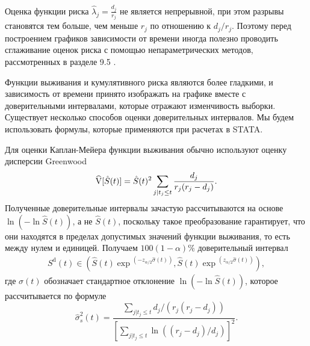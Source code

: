 \noindent
Оценка функции риска $\hat{\lambda}_j=\frac{d_j}{r_j}$ не является непрерывной, при этом разрывы становятся тем больше, чем меньше $r_j$ по отношению к $d_j/r_j$. Поэтому перед построением графиков зависимости от времени иногда полезно проводить сглаживание оценок риска с помощью непараметрических методов, рассмотренных в разделе 9.5%
.

Функции выживания и кумулятивного риска являются более гладкими, и зависимость от времени принято изображать на графике вместе с доверительными интервалами, которые отражают изменчивость выборки. Существует несколько способов оценки доверительных интервалов. Мы будем использовать формулы, которые применяются при расчетах в STATA.

Для оценки Каплан-Мейера функции выживания обычно используют оценку дисперсии Greenwood
    $$\widehat{\mathrm{V}}[\hat{S}(t)]=\hat{S}(t)^2\sum_{j|t_j\le t}\frac{d_j}{r_j(r_j-d_j)}.$$
Полученные доверительные интервалы зачастую рассчитываются на основе $\ln(-\ln\hat{S}(t))$, а не $\hat{S}(t)$, поскольку такое преобразование гарантирует, что они находятся в пределах допустимых значений
функции выживания, то есть между нулем и единицей. Получаем $100(1-\alpha)\%$ доверительный интервал
        \begin{align}
        \label{eq:17.15}
        S^{\mathrm{d}}(t)\in (\hat{S}(t)\exp{}^{(-z_{\alpha/2} \hat{\sigma}(t))},\hat{S}(t)\exp{}^{(z_{\alpha/2} \hat{\sigma}(t))}),
        \end{align}
где $\sigma(t)$ обозначает стандартное отклонение $\ln(-\ln\hat{S}(t))$, которое рассчитывается по формуле
    $$\hat{\sigma}^2_s(t)=\frac{\sum_{j|t_j\le t} d_j/(r_j(r_j-d_j))}{\left[ \sum_{j|t_j\le t} \ln ((r_j-d_j)/d_j)\right] ^2}.$$

